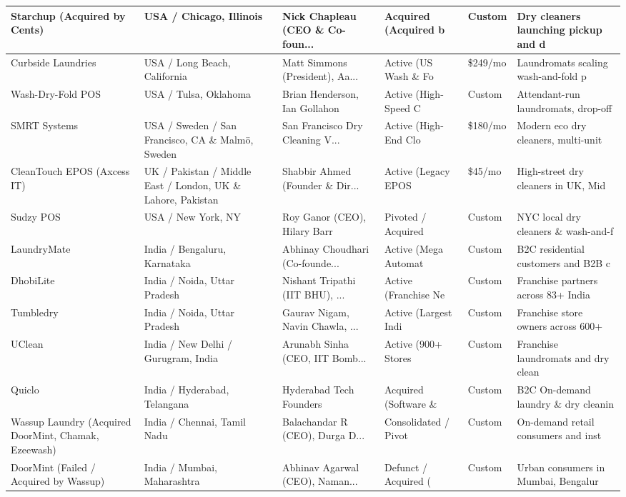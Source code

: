 \documentclass[11pt,a4paper]{article}
\begin{document}
\begin{longtable}{p{3.2cm} p{2.2cm} p{2.5cm} p{2.2cm} p{1.8cm} p{2.5cm}}
\midrule
Starchup (Acquired by Cents) & USA / Chicago, Illinois & Nick Chapleau (CEO \& Co-foun... & Acquired (Acquired b & Custom & Dry cleaners launching pickup and d \\
\midrule
Curbside Laundries & USA / Long Beach, California & Matt Simmons (President), Aa... & Active (US Wash \& Fo & \$249/mo & Laundromats scaling wash-and-fold p \\
\midrule
Wash-Dry-Fold POS & USA / Tulsa, Oklahoma & Brian Henderson, Ian Gollahon & Active (High-Speed C & Custom & Attendant-run laundromats, drop-off \\
\midrule
SMRT Systems & USA / Sweden / San Francisco, CA \& Malmö, Sweden & San Francisco Dry Cleaning V... & Active (High-End Clo & \$180/mo & Modern eco dry cleaners, multi-unit \\
\midrule
CleanTouch EPOS (Axcess IT) & UK / Pakistan / Middle East / London, UK \& Lahore, Pakistan & Shabbir Ahmed (Founder \& Dir... & Active (Legacy EPOS  & \$45/mo & High-street dry cleaners in UK, Mid \\
\midrule
Sudzy POS & USA / New York, NY & Roy Ganor (CEO), Hilary Barr & Pivoted / Acquired & Custom & NYC local dry cleaners \& wash-and-f \\
\midrule
LaundryMate & India / Bengaluru, Karnataka & Abhinay Choudhari (Co-founde... & Active (Mega Automat & Custom & B2C residential customers and B2B c \\
\midrule
DhobiLite & India / Noida, Uttar Pradesh & Nishant Tripathi (IIT BHU), ... & Active (Franchise Ne & Custom & Franchise partners across 83+ India \\
\midrule
Tumbledry & India / Noida, Uttar Pradesh & Gaurav Nigam, Navin Chawla, ... & Active (Largest Indi & Custom & Franchise store owners across 600+  \\
\midrule
UClean & India / New Delhi / Gurugram, India & Arunabh Sinha (CEO, IIT Bomb... & Active (900+ Stores  & Custom & Franchise laundromats and dry clean \\
\midrule
Quiclo & India / Hyderabad, Telangana & Hyderabad Tech Founders & Acquired (Software \& & Custom & B2C On-demand laundry \& dry cleanin \\
\midrule
Wassup Laundry (Acquired DoorMint, Chamak, Ezeewash) & India / Chennai, Tamil Nadu & Balachandar R (CEO), Durga D... & Consolidated / Pivot & Custom & On-demand retail consumers and inst \\
\midrule
DoorMint (Failed / Acquired by Wassup) & India / Mumbai, Maharashtra & Abhinav Agarwal (CEO), Naman... & Defunct / Acquired ( & Custom & Urban consumers in Mumbai, Bengalur \\

\end{longtable}
\end{document}
